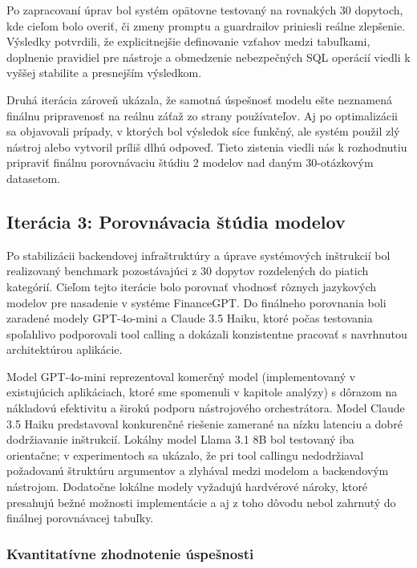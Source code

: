 Po zapracovaní úprav bol systém opätovne testovaný na rovnakých 30 dopytoch, kde
cieľom bolo overiť, či zmeny promptu a guardrailov priniesli reálne zlepšenie.
Výsledky potvrdili, že explicitnejšie definovanie vzťahov medzi tabuľkami,
doplnenie pravidiel pre nástroje a obmedzenie nebezpečných SQL operácií viedli k
vyššej stabilite a presnejším výsledkom.

Druhá iterácia zároveň ukázala, že samotná úspešnosť modelu ešte neznamená finálnu
pripravenosť na reálnu záťaž zo strany používateľov. Aj po optimalizácii sa
objavovali prípady, v ktorých bol výsledok síce funkčný, ale systém použil zlý
nástroj alebo vytvoril príliš dlhú odpoveď. Tieto zistenia viedli nás k rozhodnutiu
pripraviť finálnu porovnávaciu štúdiu 2 modelov nad daným 30-otázkovým datasetom.

\subsection{Iterácia 3: Porovnávacia štúdia modelov}

Po stabilizácii backendovej infraštruktúry a úprave systémových inštrukcií bol
realizovaný benchmark pozostávajúci z 30 dopytov rozdelených do piatich
kategórií. Cieľom tejto iterácie bolo porovnať vhodnosť rôznych jazykových modelov
pre nasadenie v systéme FinanceGPT. Do finálneho porovnania boli zaradené modely
GPT-4o-mini a Claude 3.5 Haiku, ktoré počas testovania spoľahlivo podporovali tool
calling a dokázali konzistentne pracovať s navrhnutou architektúrou aplikácie.

Model GPT-4o-mini reprezentoval komerčný model (implementovaný v existujúcich
aplikáciach, ktoré sme spomenuli v kapitole analýzy) s dôrazom na nákladovú
efektivitu a širokú podporu nástrojového orchestrátora. Model Claude 3.5 Haiku predstavoval
konkurenčné riešenie zamerané na nízku latenciu a dobré dodržiavanie inštrukcií.
Lokálny model Llama 3.1 8B bol testovaný iba orientačne; v experimentoch sa ukázalo,
že pri tool callingu nedodržiaval požadovanú štruktúru argumentov a zlyhával
medzi modelom a backendovým nástrojom. Dodatočne lokálne modely vyžadujú hardvérové
nároky, ktoré presahujú bežné možnosti implementácie a aj z toho dôvodu nebol
zahrnutý do finálnej porovnávacej tabuľky.

\subsubsection{Kvantitatívne zhodnotenie úspešnosti}

